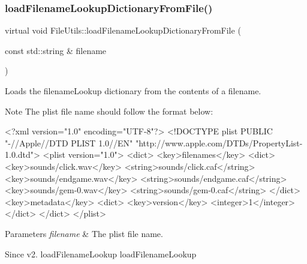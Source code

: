 \subsubsection{\texorpdfstring{load\+Filename\+Lookup\+Dictionary\+From\+File()}{loadFilenameLookupDictionaryFromFile()}\hspace{0.1cm}{\footnotesize\ttfamily [2/2]}}
{\footnotesize\ttfamily virtual void File\+Utils\+::load\+Filename\+Lookup\+Dictionary\+From\+File (\begin{DoxyParamCaption}\item[{const std\+::string \&}]{filename }\end{DoxyParamCaption})\hspace{0.3cm}{\ttfamily [virtual]}}

Loads the filename\+Lookup dictionary from the contents of a filename.

\begin{DoxyNote}{Note}
The plist file name should follow the format below\+:
\end{DoxyNote}

\begin{DoxyCode}
<?xml version=\textcolor{stringliteral}{"1.0"} encoding=\textcolor{stringliteral}{"UTF-8"}?>
<!DOCTYPE plist PUBLIC \textcolor{stringliteral}{"-//Apple//DTD PLIST 1.0//EN"} \textcolor{stringliteral}{"http://www.apple.com/DTDs/PropertyList-1.0.dtd"}>
<plist version=\textcolor{stringliteral}{"1.0"}>
<dict>
    <key>filenames</key>
    <dict>
        <key>sounds/click.wav</key>
        <\textcolor{keywordtype}{string}>sounds/click.caf</\textcolor{keywordtype}{string}>
        <key>sounds/endgame.wav</key>
        <\textcolor{keywordtype}{string}>sounds/endgame.caf</\textcolor{keywordtype}{string}>
        <key>sounds/gem-0.wav</key>
        <\textcolor{keywordtype}{string}>sounds/gem-0.caf</\textcolor{keywordtype}{string}>
    </dict>
    <key>metadata</key>
    <dict>
        <key>version</key>
        <integer>1</integer>
    </dict>
</dict>
</plist>
\end{DoxyCode}
 
\begin{DoxyParams}{Parameters}
{\em filename} & The plist file name.\\
\hline
\end{DoxyParams}
\begin{DoxySince}{Since}
v2.  load\+Filename\+Lookup  load\+Filename\+Lookup 
\end{DoxySince}
\mbox{\label{classFileUtils_a2a54bfc34349410e94c3b53e61bc026f}} 
